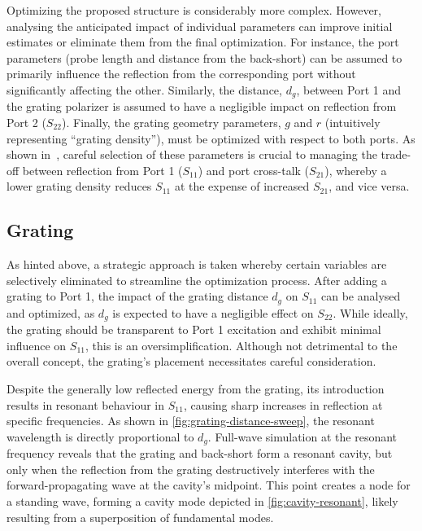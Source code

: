 \documentclass[11pt,a4paper,twoside,openany]{report}
\begin{document}
Optimizing the proposed structure is considerably more complex. However, analysing the anticipated impact of individual parameters can improve initial estimates or eliminate them from the final optimization. For instance, the port parameters (probe length and distance from the back-short) can be assumed to primarily influence the reflection from the corresponding port without significantly affecting the other. Similarly, the distance, $d_g$, between Port 1 and the grating polarizer is assumed to have a negligible impact on reflection from Port 2 ($S_{22}$). Finally, the grating geometry parameters, $g$ and $r$ (intuitively representing \enquote{grating density}), must be optimized with respect to both ports. As shown in~\parencite{karki-et-al:dual-polarized-probe-for-planar-near-field-measurement}, careful selection of these parameters is crucial to managing the trade-off between reflection from Port 1 ($S_{11}$) and port cross-talk ($S_{21}$), whereby a lower grating density reduces $S_{11}$ at the expense of increased $S_{21}$, and vice versa.

\subsection{Grating}
\label{subsection:grating}
As hinted above, a strategic approach is taken whereby certain variables are selectively eliminated to streamline the optimization process. After adding a grating to Port 1, the impact of the grating distance $d_g$ on $S_{11}$ can be analysed and optimized, as $d_g$ is expected to have a negligible effect on $S_{22}$. While ideally, the grating should be transparent to Port 1 excitation and exhibit minimal influence on $S_{11}$, this is an oversimplification. Although not detrimental to the overall concept, the grating's placement necessitates careful consideration.

Despite the generally low reflected energy from the grating, its introduction results in resonant behaviour in $S_{11}$, causing sharp increases in reflection at specific frequencies. As shown in \cref{fig:grating-distance-sweep}, the resonant wavelength is directly proportional to $d_g$. Full-wave simulation at the resonant frequency reveals that the grating and back-short form a resonant cavity, but only when the reflection from the grating destructively interferes with the forward-propagating wave at the cavity's midpoint. This point creates a node for a standing wave, forming a cavity mode depicted in \cref{fig:cavity-resonant}, likely resulting from a superposition of fundamental modes.
\end{document}
